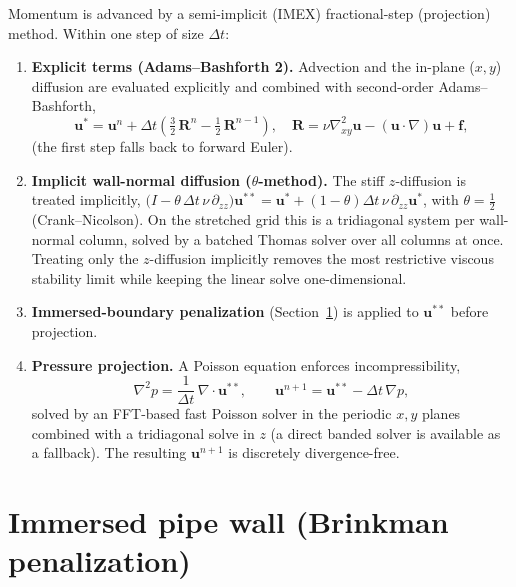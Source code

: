 \documentclass[11pt]{article}
\newcommand{\uvec}{\bm{u}}
\begin{document}
Momentum is advanced by a semi-implicit (IMEX) fractional-step
(projection) method. Within one step of size $\Delta t$:
\begin{enumerate}\itemsep2pt
\item \textbf{Explicit terms (Adams--Bashforth 2).} Advection and the
  in-plane ($x,y$) diffusion are evaluated explicitly and combined with
  second-order Adams--Bashforth,
  \begin{equation}
    \uvec^* = \uvec^n + \Delta t\!\left(
      \tfrac{3}{2}\,\bm{R}^{n} - \tfrac{1}{2}\,\bm{R}^{n-1}\right),
    \quad
    \bm{R} = \nu\nabla^2_{xy}\uvec - (\uvec\cdot\nabla)\uvec + \bm{f},
  \end{equation}
  (the first step falls back to forward Euler).
\item \textbf{Implicit wall-normal diffusion ($\theta$-method).} The
  stiff $z$-diffusion is treated implicitly,
  $\bigl(I - \theta\,\Delta t\,\nu\,\partial_{zz}\bigr)\uvec^{**}
   = \uvec^* + (1-\theta)\Delta t\,\nu\,\partial_{zz}\uvec^*$,
  with $\theta = \tfrac12$ (Crank--Nicolson). On the stretched grid this
  is a tridiagonal system per wall-normal column, solved by a batched
  Thomas solver over all columns at once. Treating only the $z$-diffusion
  implicitly removes the most restrictive viscous stability limit while
  keeping the linear solve one-dimensional.
\item \textbf{Immersed-boundary penalization} (Section~\ref{sec:ib}) is
  applied to $\uvec^{**}$ before projection.
\item \textbf{Pressure projection.} A Poisson equation enforces
  incompressibility,
  \begin{equation}
    \nabla^2 p = \frac{1}{\Delta t}\,\nabla\!\cdot\uvec^{**},
    \qquad
    \uvec^{n+1} = \uvec^{**} - \Delta t\,\nabla p,
  \end{equation}
  solved by an FFT-based fast Poisson solver in the periodic
  $x,y$ planes combined with a tridiagonal solve in $z$ (a direct
  banded solver is available as a fallback). The resulting
  $\uvec^{n+1}$ is discretely divergence-free.
\end{enumerate}

\section{Immersed pipe wall (Brinkman penalization)}
\label{sec:ib}
\end{document}

